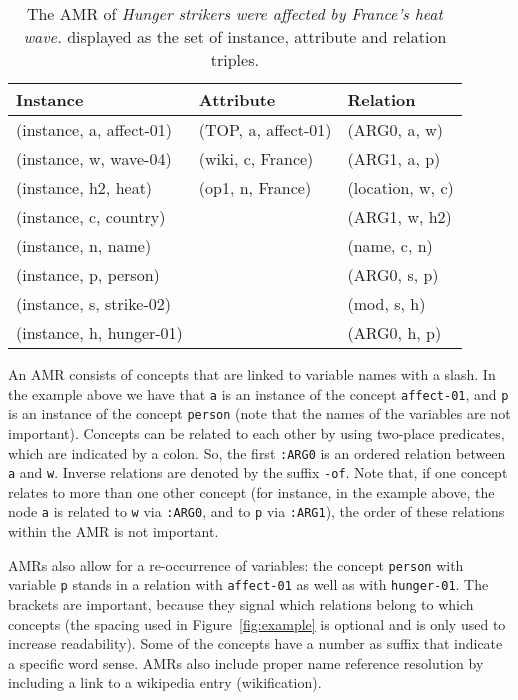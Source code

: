 \documentclass[a4paper,10pt,twoside]{article}
\begin{document}
\begin{table}[!htb]
\centering
\caption{\label{tab:triples}The AMR of \emph{Hunger strikers were affected by France's heat wave.} displayed as the set of instance, attribute and relation triples.}
\begin{tabular}{lll}
\toprule
\textbf{Instance}        & \textbf{Attribute}  & \textbf{Relation} \\ \midrule
(instance, a, affect-01) & (TOP, a, affect-01) & (ARG0, a, w)      \\
(instance, w, wave-04)   & (wiki, c, France)   & (ARG1, a, p)      \\
(instance, h2, heat)     & (op1, n, France)    & (location, w, c)  \\
(instance,  c, country)  &                     & (ARG1, w, h2)     \\
(instance, n, name)      &                     & (name, c, n)      \\
(instance, p, person)    &                     & (ARG0, s, p)      \\
(instance, s, strike-02) &                     & (mod, s, h)       \\
(instance, h, hunger-01) &                     & (ARG0, h, p)     \\ \bottomrule
\end{tabular}
\end{table}

An AMR consists of concepts that are linked to variable names with a slash. In the example above we have that \texttt{a} is an instance of the concept \texttt{affect-01}, and \texttt{p} is an instance of the concept \texttt{person} (note that the names of the variables are not important). Concepts can be related to each other by using two-place predicates, which are indicated by a colon. So, the first \texttt{:ARG0} is an ordered relation between \texttt{a} and \texttt{w}. Inverse relations are denoted by the suffix \texttt{-of}. Note that, if one concept relates to more than one other concept (for instance, in the example above, the node \texttt{a} is related to \texttt{w} via \texttt{:ARG0}, and to \texttt{p} via \texttt{:ARG1}), the order of these relations within the AMR is not important. 

AMRs also allow for a re-occurrence of variables: the concept \texttt{person} with variable \texttt{p} stands in a relation with \texttt{affect-01} as well as with \texttt{hunger-01}. The brackets are important, because they signal which relations belong to which concepts (the spacing used in Figure~\ref{fig:example} is optional and is only used to increase readability). Some of the concepts have a number as suffix that indicate a specific word sense. AMRs also include proper name reference resolution by including a link to a wikipedia entry (wikification).
\end{document}
